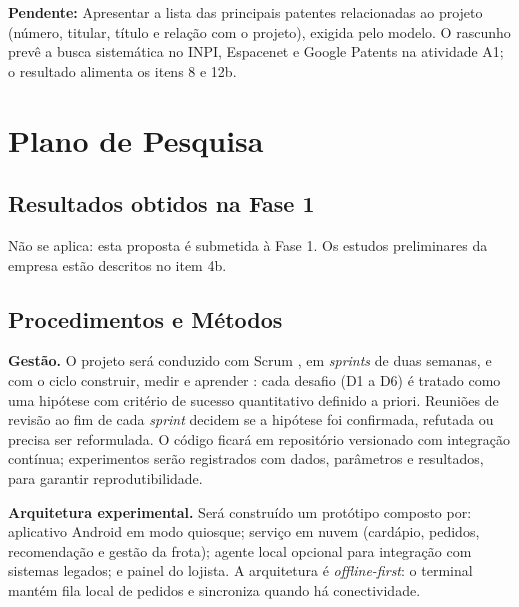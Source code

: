 \documentclass[12pt,a4paper]{article}
\newcommand{\pendente}[1]{\begin{pendbox}\textbf{\color{pendfg}Pendente:} #1\end{pendbox}}
\begin{document}
\pendente{Apresentar a lista das principais patentes relacionadas ao projeto (número, titular, título e relação com o projeto), exigida pelo modelo. O rascunho prevê a busca sistemática no INPI, Espacenet e Google Patents na atividade A1; o resultado alimenta os itens 8 e 12b.}

\section{Plano de Pesquisa}

\subsection{Resultados obtidos na Fase 1}

Não se aplica: esta proposta é submetida à Fase 1. Os estudos preliminares da empresa estão descritos no item 4b.

\subsection{Procedimentos e Métodos}

\textbf{Gestão.} O projeto será conduzido com Scrum \cite{scrum2020}, em \textit{sprints} de duas semanas, e com o ciclo construir, medir e aprender \cite{ries2011}: cada desafio (D1 a D6) é tratado como uma hipótese com critério de sucesso quantitativo definido a priori. Reuniões de revisão ao fim de cada \textit{sprint} decidem se a hipótese foi confirmada, refutada ou precisa ser reformulada. O código ficará em repositório versionado com integração contínua; experimentos serão registrados com dados, parâmetros e resultados, para garantir reprodutibilidade.

\textbf{Arquitetura experimental.} Será construído um protótipo composto por: aplicativo Android em modo quiosque; serviço em nuvem (cardápio, pedidos, recomendação e gestão da frota); agente local opcional para integração com sistemas legados; e painel do lojista. A arquitetura é \textit{offline-first}: o terminal mantém fila local de pedidos e sincroniza quando há conectividade.
\end{document}

